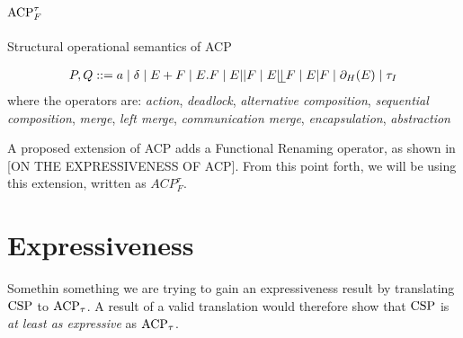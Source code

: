 \section{\texorpdfstring{$\mathrm{ACP}_{F}^{\tau}$}{ACP-tf}}


\begin{table}[htb]
\begin{center}
\end{center}
\caption{Structural operational semantics of ACP}
\label{table:ACP}
\end{table}

\begin{align*}
   P, Q ::= a \mid \delta \mid E + F \mid E . F \mid E \merge F \mid E \leftmerge F \mid E | F \mid \restrict(E) \mid \tau_{I}
\end{align*}
where the operators are: \textit{action}, \textit{deadlock}, \textit{alternative composition}, \textit{sequential composition}, \textit{merge}, \textit{left merge}, \textit{communication merge}, \textit{encapsulation}, \textit{abstraction}

A proposed extension of ACP adds a Functional Renaming operator, as shown in [ON THE EXPRESSIVENESS OF ACP]. From this point forth, we will be using this extension, written as $ACP^{\tau}_{F}$. 


\section{Expressiveness}
Somethin something we are trying to gain an expressiveness result by translating $\mathrm{CSP}$ to $\mathrm{ACP}_{\tau}$. A result of a valid translation would therefore show that $\mathrm{CSP}$ is \textit{at least as expressive} as $\mathrm{ACP}_{\tau}$.

